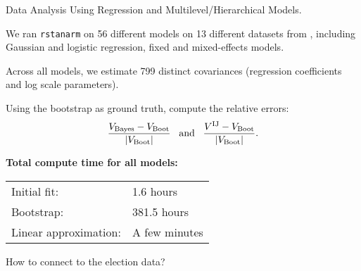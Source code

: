 \begin{frame}{Data Analysis Using Regression and Multilevel/Hierarchical Models.}

    \begin{minipage}{0.44\textwidth}
    
    We ran \texttt{rstanarm} on 56 different models on 13 different datasets
    from \citet{gelman:2006:arm},
    including Gaussian and logistic regression, fixed and mixed-effects models.
    
    \spskip Across all models, we estimate 799 distinct covariances (regression
    coefficients and log scale parameters).
    
    \spskip
    Using the bootstrap as ground truth, compute the relative errors:
    \begin{align*}
    \frac{V_{\mathrm{Bayes}} - V_{\mathrm{Boot}}}{|V_{\mathrm{Boot}}|}
    \,\,\,
    \textrm{ and }
    \,\,\,
    \frac{V^{\mathrm{IJ}} - V_{\mathrm{Boot}}}{|V_{\mathrm{Boot}}|}.
    \end{align*}
    \end{minipage}
    \hspace{1em}
    \begin{minipage}{0.44\textwidth}
        \ARMGraphDiff
        \textbf{Total compute time for all models:}
    
        \begin{tabular}{ll}
        Initial fit: & 1.6 hours \\
        Bootstrap: & 381.5 hours\\
        Linear approximation: & A few minutes \\
    \end{tabular}
\end{minipage}

\end{frame}



\begin{frame}[c]{How to connect to the election data?}


\begin{minipage}{0.48\textwidth}
    \ElectionData{}
\end{minipage}
\begin{minipage}{0.48\textwidth}
    \ElectionResultsGlobal{}
\end{minipage}


\end{frame}
    